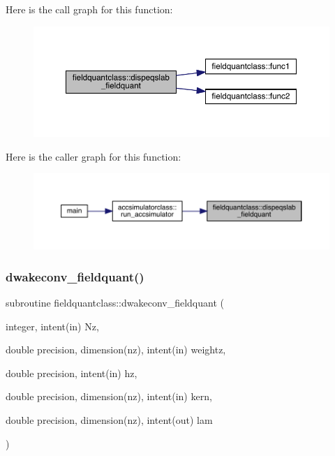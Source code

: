 Here is the call graph for this function\+:\nopagebreak
\begin{figure}[H]
\begin{center}
\leavevmode
\includegraphics[width=350pt]{namespacefieldquantclass_a362a63ffd1dbce47680a0224d88552c7_cgraph}
\end{center}
\end{figure}
Here is the caller graph for this function\+:\nopagebreak
\begin{figure}[H]
\begin{center}
\leavevmode
\includegraphics[width=350pt]{namespacefieldquantclass_a362a63ffd1dbce47680a0224d88552c7_icgraph}
\end{center}
\end{figure}
\mbox{\label{namespacefieldquantclass_a80dd0228de4fecabda6f6696b098a11f}} 
\subsubsection{\texorpdfstring{dwakeconv\_fieldquant()}{dwakeconv\_fieldquant()}}
{\footnotesize\ttfamily subroutine fieldquantclass\+::dwakeconv\+\_\+fieldquant (\begin{DoxyParamCaption}\item[{integer, intent(in)}]{Nz,  }\item[{double precision, dimension(nz), intent(in)}]{weightz,  }\item[{double precision, intent(in)}]{hz,  }\item[{double precision, dimension(nz), intent(in)}]{kern,  }\item[{double precision, dimension(nz), intent(out)}]{lam }\end{DoxyParamCaption})}

